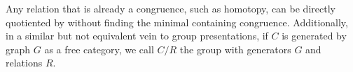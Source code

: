 \begin{remark}
	Any relation that is already a congruence, such as homotopy, can be directly quotiented by without finding the minimal containing congruence. Additionally, in a similar but not equivalent vein to group presentations, if $C$ is generated by graph $G$ as a free category, we call $C/R$ the group with generators $G$ and relations $R$.
\end{remark}

